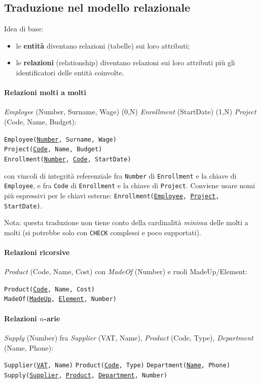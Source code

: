 \documentclass[a4paper,12pt]{article}
\begin{document}
\subsection{Traduzione nel modello relazionale}

Idea di base:
\begin{itemize}
  \item le \textbf{entità} diventano relazioni (tabelle) sui loro attributi;
  \item le \textbf{relazioni} (relationship) diventano relazioni sui loro
    attributi più gli identificatori delle entità coinvolte.
\end{itemize}

\paragraph{Relazioni molti a molti} \emph{Employee} (Number, Surname, Wage)
(0,N) \emph{Enrollment} (StartDate) (1,N) \emph{Project} (Code, Name, Budget):
\begin{center}
\texttt{Employee(\underline{Number}, Surname, Wage)}\\
\texttt{Project(\underline{Code}, Name, Budget)}\\
\texttt{Enrollment(\underline{Number}, \underline{Code}, StartDate)}
\end{center}
con vincoli di integrità referenziale fra \texttt{Number} di
\texttt{Enrollment} e la chiave di \texttt{Employee}, e fra \texttt{Code} di
\texttt{Enrollment} e la chiave di \texttt{Project}. Conviene usare nomi più
espressivi per le chiavi esterne:
\texttt{Enrollment(\underline{Employee}, \underline{Project}, StartDate)}.

Nota: questa traduzione non tiene conto della cardinalità \emph{minima} delle
molti a molti (si potrebbe solo con \texttt{CHECK} complessi e poco
supportati).

\paragraph{Relazioni ricorsive} \emph{Product} (Code, Name, Cost) con
\emph{MadeOf} (Number) e ruoli MadeUp/Element:
\begin{center}
\texttt{Product(\underline{Code}, Name, Cost)}\\
\texttt{MadeOf(\underline{MadeUp}, \underline{Element}, Number)}
\end{center}

\paragraph{Relazioni $n$-arie} \emph{Supply} (Number) fra \emph{Supplier}
(VAT, Name), \emph{Product} (Code, Type), \emph{Department} (Name, Phone):
\begin{center}
\texttt{Supplier(\underline{VAT}, Name)} \quad
\texttt{Product(\underline{Code}, Type)} \quad
\texttt{Department(\underline{Name}, Phone)}\\
\texttt{Supply(\underline{Supplier}, \underline{Product},
  \underline{Department}, Number)}
\end{center}
\end{document}
